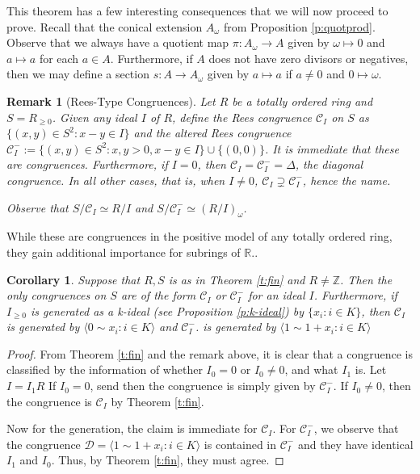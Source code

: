 \documentclass[notitlepage, 10pt]{article}
\theoremstyle{defin}
\theoremstyle{theo}
\newtheorem{cor}{Corollary}[defn]
\theoremstyle{rema}
\newtheorem{rem}{Remark}[section]
\newcommand{\R}{\mathbb{R}}
\newcommand{\Z}{\mathbb{Z}}
\newcommand{\cC}{\mathcal{C}}
\newcommand{\cD}{\mathcal{D}}
\begin{document}
This theorem has a few interesting consequences that we will now proceed to prove. Recall that the conical extension $A_\omega$ from Proposition \ref{p:quotprod}. Observe that we always have a quotient map $\pi : A_\omega \to A$ given by $\omega \mapsto 0$ and $a\mapsto a$ for each $a\in A$. Furthermore, if $A$ does not have zero divisors or negatives, then we may define a section $s: A \to A_{\omega}$ given by $a\mapsto a$ if $a\neq 0$ and $0 \mapsto \omega$. 

\begin{rem}[Rees-Type Congruences]
    Let $R$ be a totally ordered ring and $S = R_{\geq 0}$. Given any ideal $I$ of $R$, define the \textit{Rees congruence} $\cC_I$ on $S$ as $\{(x,y) \in S^2:  x-y\in I\}$ and the \textit{altered Rees congruence} $\cC_I^{-} := \{(x,y)\in S^2 :x,y>0, x-y\in I\}\cup \{(0, 0)\}$. It is immediate that these are congruences. Furthermore, if $I=0$, then $\cC_I=\cC^{-}_I = \Delta$, the diagonal congruence. In all other cases, that is, when $I\neq 0$, $\cC_I\supsetneq \cC^{-}_I$, hence the name. 

    Observe that $S/\cC_I \simeq R/I$ and $S/\cC^{-}_I \simeq (R/I)_\omega$.
\end{rem}

While these are congruences in the positive model of any totally ordered ring, they gain additional importance for subrings of $\R$..

\begin{cor}
    \label{c1:t:fin}
    Suppose that $R, S$ is as in Theorem \ref{t:fin} and $R\neq \Z$. Then the only congruences on $S$ are of the form $\cC_I$ or $\cC^{-}_I$ for an ideal $I$.
    Furthermore, if $I_{\geq 0}$ is generated as a k-ideal (see Proposition \ref{p:k-ideal}) by $\{x_i:i\in K\}$, then $\cC_I$ is generated by $\langle 0 \sim x_i : i\in K\rangle$ and $\cC^{-}_I$. is generated by $\langle 1 \sim 1+x_i : i\in K\rangle$
\end{cor}

\begin{proof}
    From Theorem \ref{t:fin} and the remark above, it is clear that a congruence is classified by the information of whether $I_0=0$ or $I_0\neq 0$, and what $I_1$ is. Let $I=I_1R$ If $I_0 = 0$, send then the congruence is simply given by $\cC^{-}_I$. If $I_0\neq 0$, then the congruence is $\cC_I$ by Theorem \ref{t:fin}.

    Now for the generation, the claim is immediate for $\cC_I$. For $\cC^{-}_I$, we observe that the congruence $\cD = \langle 1 \sim 1+x_i : i\in K\rangle$ is contained in $\cC^{-}_I$ and they have identical $I_1$ and $I_0$. Thus, by Theorem \ref{t:fin}, they must agree. 
\end{proof}
\end{document}
